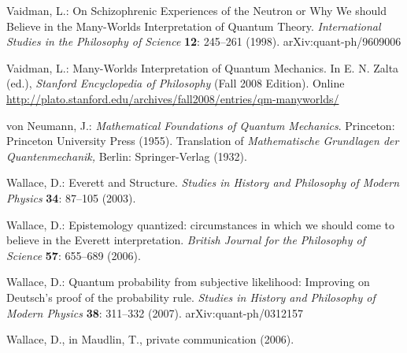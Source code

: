 \documentclass[12pt]{article}
\begin{document}
\begin{thebibliography}{29}
  Vaidman, L.: 
	On Schizophrenic Experiences of the Neutron or Why We should 
	Believe in the Many-Worlds Interpretation of Quantum Theory. 
	\textit{International Studies in the Philosophy of Science} 
	\textbf{12}: 245--261 (1998). arXiv:quant-ph/9609006

 Vaidman, L.: 
	Many-Worlds Interpretation of Quantum Mechanics. 
	In E. N. Zalta (ed.),
	\textit{Stanford Encyclopedia of Philosophy} (Fall 2008 Edition).
	Online \url{http://plato.stanford.edu/archives/fall2008/entries/qm-manyworlds/}

 von Neumann, J.:
	\textit{Mathematical Foundations of Quantum Mechanics}. 
	Princeton: Princeton University Press (1955). Translation of 
	\textit{Mathematische Grundlagen der Quantenmechanik,} 
	Berlin: Springer-Verlag (1932). 
 

 Wallace, D.: 
	Everett and Structure. 
	\textit{Studies in History and Philosophy of Modern Physics} 
	\textbf{34}: 87--105 (2003). 

 Wallace, D.: 
	Epistemology quantized: circumstances in which we should come to believe in the Everett interpretation. \textit{British Journal for
the Philosophy of Science} \textbf{57}: 655--689 (2006).


 Wallace, D.: 
	Quantum probability from subjective likelihood: Improving on Deutsch's proof of the probability rule. 
	\textit{Studies in History and Philosophy of Modern Physics} 
	\textbf{38}: 311--332 (2007). arXiv:quant-ph/0312157



 Wallace, D., in Maudlin, T., private communication (2006).

\end{thebibliography}
\end{document}
